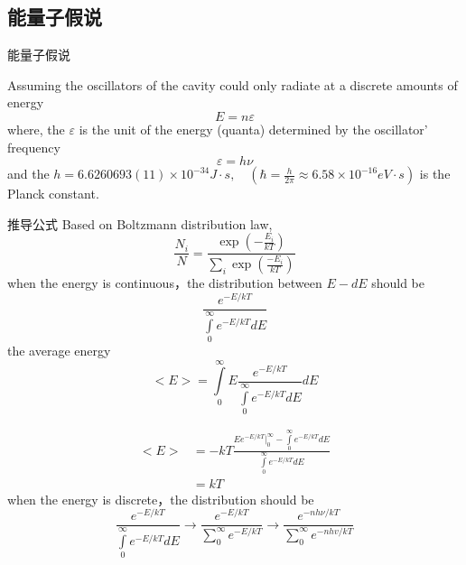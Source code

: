 \subsection{能量子假说}
\begin{frame}{能量子假说}
    \begin{tcolorbox4}
    Assuming the oscillators of the cavity could only radiate at a discrete amounts of energy
    \begin{equation}
        E=n\varepsilon
    \end{equation}
    where, the $\varepsilon$ is the unit of the energy (quanta) determined by the oscillator' frequency 
    \begin{equation}
        \varepsilon=h\nu
    \end{equation}
    and the $h=6.6260693(11)\times10^{-34} J\cdot s,\quad (\hbar=\frac{h}{2\pi} \approx 6.58\times 10^{-16} eV\cdot s )$ is the Planck constant. 
    \end{tcolorbox4}
\end{frame}

\begin{frame} {推导公式}
    Based on Boltzmann distribution law,
    \begin{equation*}
        \frac{N_{i}}{N}=\frac{\exp \left(-\frac{E_{i}}{k T}\right)}{\sum_{i} \exp \left(\frac{-E_{i}}{k T}\right)}
    \end{equation*}
    {\Bullet} when the energy is continuous，the distribution between $E - dE$ should be 
    \begin{equation*}
        \frac{e^{-E / k T}}{\int\limits_{0}^{\infty} e^{-E / k T} d E}
    \end{equation*}  
    the average energy 
    \begin{equation*}
        <E>=\int\limits_{0}^{\infty} E \frac{e^{-E / k T}}{\int\limits_{0}^{\infty} e^{-E / k T} d E} d E
    \end{equation*}
\end{frame}

\begin{frame}
    \begin{equation*}
        \begin{split}
            <E> &= -kT \frac{Ee^{-E / k T}\vert_0 ^\infty-\int\limits_{0}^{\infty} e^{-E / k T} d E } {\int\limits_{0}^{\infty} e^{-E / k T} d E }\\  
                &= kT
        \end{split}  
    \end{equation*} 
    {\Bullet} when the energy is discrete，the distribution should be   
    \begin{equation*}
        \frac{e^{-E / k T}}{\int\limits_{0}^{\infty} e^{-E / k T} d E} 
        \to \frac{e^{-E / k T}}{\sum\limits_{0}^{\infty} e^{-E / k T}} 
        \to \frac{e^{-nh\nu / k T}}{\sum\limits_{0}^{\infty} e^{-nhv / k T}} 
    \end{equation*}    
\end{frame}


